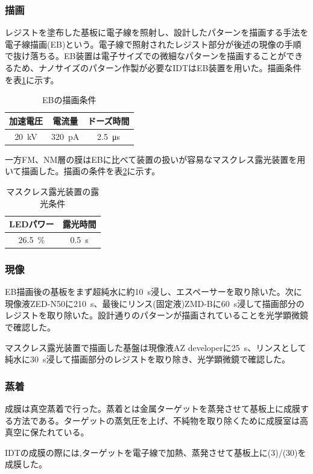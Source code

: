 \documentclass[dvipdfmx,11pt]{jsreport}
\numberwithin{equation}{chapter}
\numberwithin{table}{chapter}
\begin{document}
\subsubsection{描画}
レジストを塗布した基板に電子線を照射し、設計したパターンを描画する手法を電子線描画(EB)という。電子線で照射されたレジスト部分が後述の現像の手順で抜け落ちる。EB装置は電子サイズでの微細なパターンを描画することができるため、ナノサイズのパターン作製が必要なIDTはEB装置を用いた。描画条件を表\ref{tab:1}に示す。
\begin{table}[H]
	\centering
	\caption{EBの描画条件}
	\label{tab:1}
	\begin{tabular}{ccc} \hline \hline
		加速電圧&電流量&ドーズ時間\\ \hline
		\SI{20}{kV}&\SI{320}{\pico \ampere}&\SI{2.5}{\micro \second} \\ \hline \hline
	\end{tabular}
\end{table}
一方FM、NM層の膜はEBに比べて装置の扱いが容易なマスクレス露光装置を用いて描画した。描画の条件を表\ref{tab:2}に示す。
\begin{table}[H]
	\centering
	\caption{マスクレス露光装置の露光条件}
	\label{tab:2}
	\begin{tabular}{cc} \hline \hline
		LEDパワー&露光時間\\ \hline
		\SI{26.5}{\%}&\SI{0.5}{\second} \\ \hline \hline
	\end{tabular}
\end{table}
\subsubsection{現像}
EB描画後の基板をまず超純水に約\SI{10}{s}浸し、エスペーサーを取り除いた。次に現像液ZED-N50に\SI{210}{s}、最後にリンス(固定液)ZMD-Bに\SI{60}{s}浸して描画部分のレジストを取り除いた。設計通りのパターンが描画されていることを光学顕微鏡で確認した。

マスクレス露光装置で描画した基盤は現像液AZ developerに\SI{25}{s}、リンスとして純水に\SI{30}{s}浸して描画部分のレジストを取り除き、光学顕微鏡で確認した。
\subsubsection{蒸着}
成膜は真空蒸着で行った。蒸着とは金属ターゲットを蒸発させて基板上に成膜する方法である。ターゲットの蒸気圧を上げ、不純物を取り除くために成膜室は高真空に保たれている。

IDTの成膜の際には,ターゲットを電子線で加熱、蒸発させて基板上に(3)/(30)を成膜した。
\end{document}
